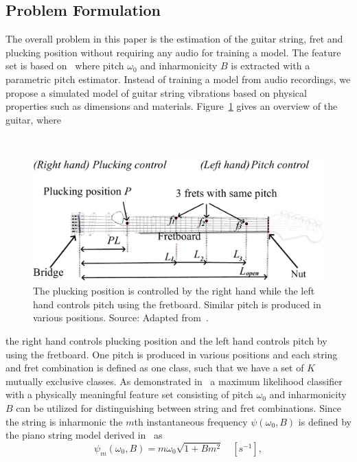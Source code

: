 \documentclass{article}
\begin{document}
\begin{sloppy}
\section{Problem Formulation}
The overall problem in this paper is the estimation of the guitar string, fret and plucking position without requiring any audio for training a model. The feature set is based on~\cite{hjerrild::icassp19} where pitch $\omega_0$ and inharmonicity $B$ is extracted with a parametric pitch estimator.  Instead of training a model from audio recordings, we propose a simulated model of guitar string vibrations based on physical properties such as dimensions and materials. Figure~\ref{fig:guitar_overview} gives an overview of the guitar, where 
\begin{figure}[h!]\
  \centering
  \centerline{\includegraphics[width=1\columnwidth]{img/fender_drawing4.png}}
  \caption{The plucking position is controlled by the right hand while the left hand controls pitch using the fretboard. Similar pitch is produced in various positions. Source: Adapted from~\cite{phillips}.
  }\label{fig:guitar_overview}\vspace{-2mm}
\end{figure}
%
the right hand controls plucking position and the left hand controls pitch by using the fretboard. One pitch is produced in various positions and each string and fret combination is defined as one class, such that we have a set of $K$ mutually exclusive classes. 
%
%
%
% 
As demonstrated in~\cite{hjerrild::icassp19} a maximum likelihood classifier with a physically meaningful feature set consisting of pitch $\omega_0$ and inharmonicity $B$ can be utilized for distinguishing between string and fret combinations. 
Since the string is inharmonic the $m$th instantaneous frequency $\psi(\omega_0,B)$ is defined by the piano string model derived in~\cite{fletcher:piano_model} as 
%
\begin{equation}
  \psi_m(\omega_0,B) = m \omega_0 \sqrt{1+B m^2} \quad [s^{-1}], 
\end{equation}

\end{sloppy}
\end{document}
